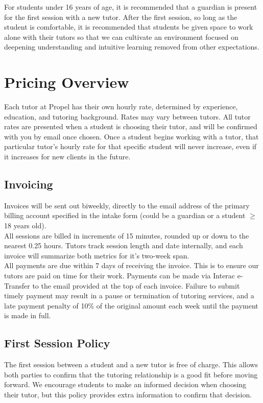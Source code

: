\documentclass{article}
\begin{document}
For students under 16 years of age, it is recommended that a guardian is present for the first session with a new tutor. After the first session, so long as the student is comfortable, it is recommended that students be given space to work alone with their tutors so that we can cultivate an environment focused on deepening understanding and intuitive learning removed from other expectations.

\section{Pricing Overview}
Each tutor at Propel has their own hourly rate, determined by experience, education, and tutoring background. Rates may vary between tutors. All tutor rates are presented when a student is choosing their tutor, and will be confirmed with you by email once chosen. Once a student begins working with a tutor, that particular tutor’s hourly rate for that specific student will never increase, even if it increases for new clients in the future.

\subsection{Invoicing}
Invoices will be sent out biweekly, directly to the email address of the primary billing account specified in the intake form (could be a guardian or a student $\ge$ 18 years old).\\

All sessions are billed in increments of 15 minutes, rounded up or down to the nearest 0.25 hours. Tutors track session length and date internally, and each invoice will summarize both metrics for it's two-week span.\\

All payments are due within 7 days of receiving the invoice. This is to ensure our tutors are paid on time for their work. Payments can be made via Interac e-Transfer to the email provided at the top of each invoice. Failure to submit timely payment may result in a pause or termination of tutoring services, and a late payment penalty of 10\% of the original amount each week until the payment is made in full.

\subsection{First Session Policy}
The first session between a student and a new tutor is free of charge. This allows both parties to confirm that the tutoring relationship is a good fit before moving forward. We encourage students to make an informed decision when choosing their tutor, but this policy provides extra information to confirm that decision.\\
\end{document}
